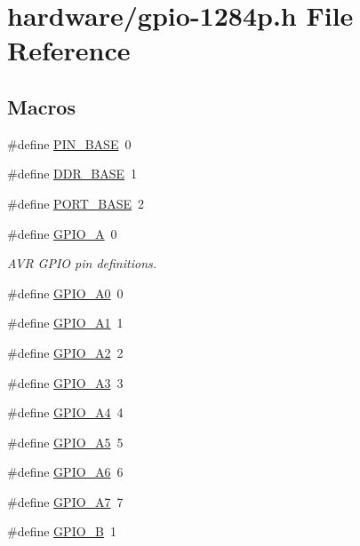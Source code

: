 \hypertarget{gpio-1284p_8h}{}\section{hardware/gpio-\/1284p.h File Reference}
\label{gpio-1284p_8h}
\subsection*{Macros}
\begin{DoxyCompactItemize}
\item 
\#define \hyperlink{gpio-1284p_8h_aefbd8c331081417f7e39490423bc55ee}{P\+I\+N\+\_\+\+B\+A\+SE}~0
\item 
\#define \hyperlink{gpio-1284p_8h_a0c234917347c5bfd7cea239572a370d7}{D\+D\+R\+\_\+\+B\+A\+SE}~1
\item 
\#define \hyperlink{gpio-1284p_8h_af96b6f28b4e12257e268cab1341aa7e3}{P\+O\+R\+T\+\_\+\+B\+A\+SE}~2
\item 
\#define \hyperlink{gpio-1284p_8h_aa416d284516ae97d71abeb030ea10625}{G\+P\+I\+O\+\_\+A}~0
\begin{DoxyCompactList}\small\item\em A\+VR G\+P\+IO pin definitions. \end{DoxyCompactList}\item 
\#define \hyperlink{gpio-1284p_8h_a35633a1b8b9211d182691a8d9a645bb0}{G\+P\+I\+O\+\_\+\+A0}~0
\item 
\#define \hyperlink{gpio-1284p_8h_a8c46e857ebf66fd859a4f95f095239fa}{G\+P\+I\+O\+\_\+\+A1}~1
\item 
\#define \hyperlink{gpio-1284p_8h_a7e0f85656e392888c37bd0d61df33f0d}{G\+P\+I\+O\+\_\+\+A2}~2
\item 
\#define \hyperlink{gpio-1284p_8h_a8ecdb12e5b16aa88e15cf6c75598f715}{G\+P\+I\+O\+\_\+\+A3}~3
\item 
\#define \hyperlink{gpio-1284p_8h_afa36e59a71229cff9229811520c221bf}{G\+P\+I\+O\+\_\+\+A4}~4
\item 
\#define \hyperlink{gpio-1284p_8h_a403c1861d1f61389df3069c0e8cf47e1}{G\+P\+I\+O\+\_\+\+A5}~5
\item 
\#define \hyperlink{gpio-1284p_8h_aec1cab20c4027d6488c5443a6e821888}{G\+P\+I\+O\+\_\+\+A6}~6
\item 
\#define \hyperlink{gpio-1284p_8h_af69d3a00d613769aef3ef0bf595ad146}{G\+P\+I\+O\+\_\+\+A7}~7
\item 
\#define \hyperlink{gpio-1284p_8h_a15e8b58ea6382db53cfb4f8de4c8920c}{G\+P\+I\+O\+\_\+B}~1

\end{DoxyCompactItemize}
